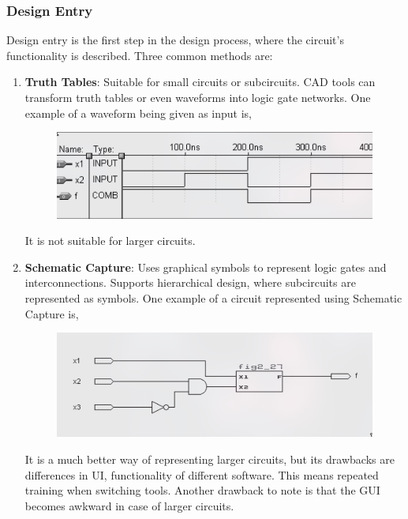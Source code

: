 \documentclass[a4paper,12pt]{article}
\begin{document}
      \subsubsection{Design Entry}
      Design entry is the first step in the design process, where the circuit's functionality is described. Three common methods are:
      \begin{enumerate}
        \item \textbf{Truth Tables}: Suitable for small circuits or subcircuits. CAD tools can transform truth tables or even waveforms into logic gate networks. One example of a waveform being given as input is,
          \begin{figure}[h!]
            \centering
            \includegraphics[scale=0.4]{figs/waveform.png}
            \label{stemplot}
          \end{figure}
          It is not suitable for larger circuits.
        \item \textbf{Schematic Capture}: Uses graphical symbols to represent logic gates and interconnections. Supports hierarchical design, where subcircuits are represented as symbols. One example of a circuit represented using Schematic Capture is,
          \begin{figure}[h!]
            \centering
            \includegraphics[scale=0.4]{figs/sc.png}
            \label{stemplot}
          \end{figure}
          It is a much better way of representing larger circuits, but its drawbacks are differences in UI, functionality of different software. This means repeated training when switching tools. Another drawback to note is that the GUI becomes awkward in case of larger circuits.

\end{enumerate}
\end{document}

